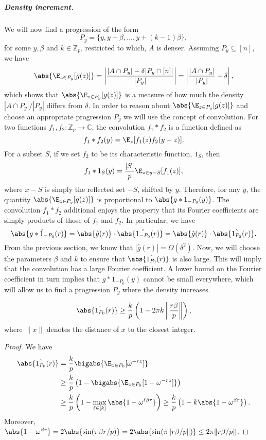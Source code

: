 \documentclass{article}
\begin{document}
\subparagraph*{Density increment.}  We will now find a progression of the form $$P_y = \{y,y+\beta,\ldots,y+(k-1)\beta\},$$ for some $y,\beta$ and $k\in \mathbb{Z}_p$, restricted to which, $A$ is denser. Assuming $P_y\subseteq [n]$, we have 
$$\abs{\E_{z\in P_y}[g(z)]} = \left|\frac{|A\cap P_y| - \delta|P_y\cap[n]|}{|P_y|}\right| = \left|\frac{|A\cap P_y|}{|P_y|} - \delta\right|,$$ which shows that $\abs{\E_{z\in P_y}[g(z)]}$ is a measure of how much the density $|A\cap P_y|/|P_y|$ differs from $\delta$. 
In order to reason about $\abs{\E_{z\in P_y}[g(z)]}$ and choose an appropriate progression $P_y$ we will use the concept of convolution. For two functions $f_1,f_2 : \mathbb{Z}_p \to \mathbb{C}$, the convolution $f_1\ast f_2$ is a function defined as
$$f_1\ast f_2(y) = \E_z[f_1(z)f_2(y-z)].$$
For a subset $S$, if we set $f_2$ to be its characteristic function, $1_S$, then $$f_1\ast 1_S(y) = \frac{|S|}{p}\E_{z\in y-S}[f_1(z)],$$
where $x-S$ is simply the reflected set $-S$, shifted by $y$. Therefore, for any $y$, the quantity $\abs{\E_{z\in P_y}[g(z)]}$ is proportional to $\abs{g\ast 1_{-P_0}(y)}$. The convolution $f_1\ast f_2$ additional enjoys the property that its Fourier   coefficients are simply products of those of $f_1$ and $f_2$. In particular, we have  $$\abs{\hat{g\ast1_{-P_0}}(r)} = \abs{\hat{g}(r)}\cdot\abs{\hat{1_{-P_0}}(r)} = \abs{\hat{g}(r)}\cdot\abs{\hat{1_{P_0}}(r)}.$$ From the previous section, we know that $|\hat{g}(r)| = \Omega(\delta^2)$. Now, we will choose the parameters $\beta$ and $k$ to ensure that $
\abs{\hat{1_{P_0}}(r)}$ is also large. This will imply that the convolution has a large Fourier coefficient. A lower bound on the Fourier coefficient in turn implies that $g\ast1_{-P_0}(y)$ cannot be small everywhere, which will allow us to find a progression $P_y$ where the density increases.

\begin{claim}\label{claim:proxy}
$$\abs{\hat{1_{P_0}}(r)} \geq \frac{k}{p}\left(1 - 2\pi k\left\|\frac{r\beta}{p}\right\|\right),$$ where $\|x\|$ denotes the distance of $x$ to the closest integer.
\end{claim}
\begin{proof} 
We have 
\begin{align*}
\abs{\hat{1_{P_0}}(r)} &= \frac{k}{p}\bigabs{\E_{z\in P_0}[\omega^{-rz}]} \\
&\geq \frac{k}{p}\left(1 - \bigabs{\E_{z\in P_0}[1-\omega^{-rz}]}\right) \\
&\geq \frac{k}{p}\left(1-  \max_{\ell\in [k]}\abs{1- \omega^{\ell\beta r}}\right) \geq \frac{k}{p}\left(1-  k\abs{1- \omega^{\beta r}}\right).
\end{align*}
Moreover, $\abs{1-\omega^{\beta r}} = 2\abs{\sin(\pi\beta r/p)} = 2\abs{\sin(\pi \|r\beta/p\|)} \leq 2\pi\|r\beta/p\|$. 
\end{proof}
\end{document}
